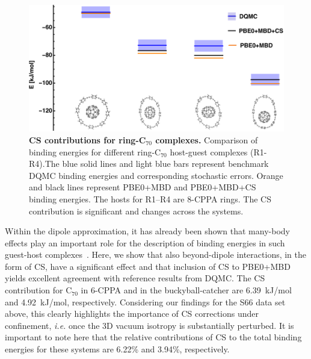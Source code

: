 \documentclass[aps,prl,groupaddress, twocolumn]{revtex4-1}  %
\begin{document}
\begin{figure}[hbtp]
\includegraphics[scale=1.]{Plots/Rings_new.pdf}
\caption{\textbf{CS contributions for ring-C$_{70}$ complexes.} Comparison of binding energies for different ring-C$_{70}$ host-guest complexes (R1-R4).The blue solid lines and light blue bars represent benchmark DQMC binding energies and corresponding stochastic errors. Orange and black lines represent PBE0+MBD and PBE0+MBD+CS binding energies. The hosts for R1--R4 are 8-CPPA rings. The CS contribution is significant and changes across the systems.}\label{fig:rings}
\end{figure}

Within the dipole approximation, it has already been shown that many-body effects play an important role for the description of binding energies in such guest-host complexes~\cite{hermann_ncomm2017}. Here, we show that also beyond-dipole interactions, in the form of CS, have a significant effect and that inclusion of CS to PBE0+MBD yields excellent agreement with reference results from DQMC\@. The CS contribution for C$_{70}$ in 6-CPPA and in the buckyball-catcher are 6.39~kJ/mol and 4.92~kJ/mol, respectively. Considering our findings for the S66 data set above, this clearly highlights the importance of CS corrections under confinement, \textit{i.e.} once the 3D vacuum isotropy is substantially perturbed. It is important to note here that the relative contributions of CS to the total binding energies for these systems are 6.22\% and 3.94\%, respectively. 
\end{document}
